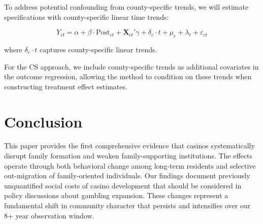 \documentclass[12pt]{article}
\begin{document}
To address potential confounding from county-specific trends, we will estimate specifications with county-specific linear time trends:

\begin{equation}
Y_{ct} = \alpha + \beta \cdot \text{Post}_{ct} + \mathbf{X}_{ct}'\gamma + \delta_c \cdot t + \mu_c + \lambda_t + \varepsilon_{ct}
\end{equation}

\noindent where $\delta_c \cdot t$ captures county-specific linear trends.

For the CS approach, we include county-specific trends as additional covariates in the outcome regression, allowing the method to condition on these trends when constructing treatment effect estimates.


\section{Conclusion}

This paper provides the first comprehensive evidence that casinos systematically disrupt family formation and weaken family-supporting institutions. The effects operate through both behavioral change among long-term residents and selective out-migration of family-oriented individuals. Our findings document previously unquantified social costs of casino development that should be considered in policy discussions about gambling expansion. These changes represent a fundamental shift in community character that persists and intensifies over our 8+ year observation window.


\singlespacing
\end{document}

